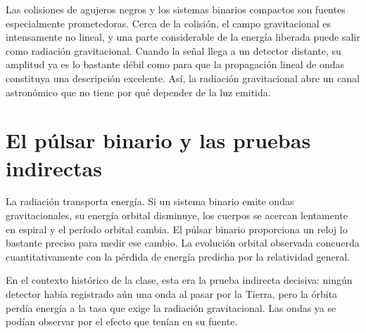 Las colisiones de agujeros negros y los sistemas binarios compactos son fuentes especialmente prometedoras. Cerca de la colisión, el campo gravitacional es intensamente no lineal, y una parte considerable de la energía liberada puede salir como radiación gravitacional. Cuando la señal llega a un detector distante, su amplitud ya es lo bastante débil como para que la propagación lineal de ondas constituya una descripción excelente. Así, la radiación gravitacional abre un canal astronómico que no tiene por qué depender de la luz emitida.

\section{El púlsar binario y las pruebas indirectas}

La radiación transporta energía. Si un sistema binario emite ondas gravitacionales, su energía orbital disminuye, los cuerpos se acercan lentamente en espiral y el período orbital cambia. El púlsar binario proporciona un reloj lo bastante preciso para medir ese cambio. La evolución orbital observada concuerda cuantitativamente con la pérdida de energía predicha por la relatividad general.

En el contexto histórico de la clase, esta era la prueba indirecta decisiva: ningún detector había registrado aún una onda al pasar por la Tierra, pero la órbita perdía energía a la tasa que exige la radiación gravitacional. Las ondas ya se podían observar por el efecto que tenían en su fuente.

\begin{classroomqa}
\end{classroomqa}

\begin{classroomqa}
\end{classroomqa}

